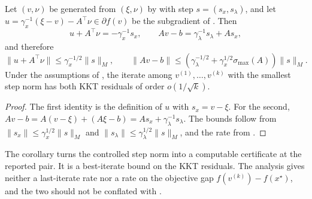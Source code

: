 \documentclass[11pt]{article}
\begin{document}
\begin{corollary}\label{cor:kkt-certificate}
    Let $(v, \nu)$ be generated from $(\xi, \nu)$ by  with step $s = (s_x, s_\lambda)$, and let $u = \gamma_x^{-1}(\xi - v) - A^\top\nu \in \partial f(v)$ be the subgradient of .
    Then
    \begin{equation}\label{eq:kkt-identities}
        u + A^\top\nu = -\gamma_x^{-1}s_x, \qquad Av - b = \gamma_\lambda^{-1}s_\lambda + As_x,
    \end{equation}
    and therefore
    \begin{equation}\label{eq:kkt-residual-bound}
        \|u + A^\top\nu\| \leq \gamma_x^{-1/2}\|s\|_M, \qquad \|Av - b\| \leq \left(\gamma_\lambda^{-1/2} + \gamma_x^{1/2}\sigma_{\max}(A)\right)\|s\|_M.
    \end{equation}
    Under the assumptions of , the iterate among $v^{(1)}, \ldots, v^{(k)}$ with the smallest step norm has both KKT residuals of order $o(1/\sqrt{k})$.
\end{corollary}
\begin{proof}
    The first identity is the definition of $u$ with $s_x = v - \xi$.
    For the second, $Av - b = A(v - \xi) + (A\xi - b) = As_x + \gamma_\lambda^{-1}s_\lambda$.
    The bounds follow from $\|s_x\| \leq \gamma_x^{1/2}\|s\|_M$ and $\|s_\lambda\| \leq \gamma_\lambda^{1/2}\|s\|_M$, and the rate from .
\end{proof}
The corollary turns the controlled step norm into a computable certificate at the reported pair.
It is a best-iterate bound on the KKT residuals.
The analysis gives neither a last-iterate rate nor a rate on the objective gap $f(v^{(k)}) - f(x^\star)$, and the two should not be conflated with .
\end{document}
